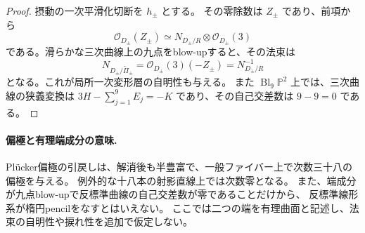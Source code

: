 \begin{proof}
摂動の一次平滑化切断を $h_\pm$ とする。
その零除数は $Z_\pm$ であり、前項から
\[
 \mathcal O_{D_\pm}(Z_\pm)
 \simeq N_{D_\pm/R}\otimes\mathcal O_{D_\pm}(3)
\]
である。滑らかな三次曲線上の九点をblow-upすると、その法束は
\[
 N_{D_\pm/\widetilde\Pi_\pm}
 =\mathcal O_{D_\pm}(3)(-Z_\pm)
 =N_{D_\pm/R}^{-1}
\]
となる。これが局所一次変形層の自明性も与える。
また $\operatorname{Bl}_9\mathbb P^2$ 上では、三次曲線の狭義変換は
$3H-\sum_{j=1}^9E_j=-K$ であり、その自己交差数は $9-9=0$ である。
\end{proof}

\paragraph{偏極と有理端成分の意味.}
Pl\"ucker偏極の引戻しは、解消後も半豊富で、一般ファイバー上で次数三十八の偏極を与える。
例外的な十八本の射影直線上では次数零となる。
また、端成分が九点blow-upで反標準曲線の自己交差数が零であることだけから、
反標準線形系が楕円pencilをなすとはいえない。
ここでは二つの端を有理曲面と記述し、法束の自明性や捩れ性を追加で仮定しない。
